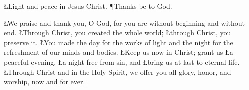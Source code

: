 \documentclass[11pt]{article}
\begin{document}



\begin{Litany}
\L{Light and peace in Jesus Christ.}
\P{Thanks be to God.}
\end{Litany}




\L{We praise and thank you, O God, for you are without beginning and without
end.}
\Indent\L{Through Christ, you created the whole world;}
\Indent\L{through Christ, you preserve it.}
\L{You made the day for the works of light and the night for the refreshment of
our minds and bodies.}
\L{Keep us now in Christ; grant us}
\Indent\L{a peaceful evening,}
\Indent\L{a night free from sin, and}
\Indent\L{bring us at last to eternal life.}
\L{Through Christ and in the Holy Spirit, we offer you all glory, honor, and
worship, now and for ever.}
\Amen



\Silence
{}





\Amen


\end{document}
